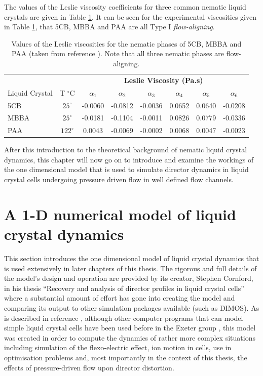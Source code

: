 The values of the Leslie viscosity coefficients for three common nematic liquid crystals are given in Table \ref{tab:visc}. It can be seen for the experimental viscosities given in Table \ref{tab:visc}, that 5CB, MBBA and PAA are all Type I \textit{flow-aligning}.
\\
\begin{table}[ht]
\centering  %
\begin{tabular}{l|c|cccccc} 
\hline\hline                       
&&\multicolumn{6}{c}{\textbf{Leslie Viscosity (Pa.s)}}\\
Liquid Crystal&T $^{\circ}$C&$\alpha_1$&$\alpha_2$&$\alpha_3$&$\alpha_4$&$\alpha_5$&$\alpha_6$\\
\hline                  
5CB &$25^{\circ}$& -0.0060& -0.0812&-0.0036&0.0652&0.0640&-0.0208\\
MBBA& $25^{\circ}$&-0.0181&-0.1104&-0.0011&0.0826&0.0779&-0.0336\\
PAA& $122^{\circ}$&0.0043&-0.0069&-0.0002&0.0068&0.0047&-0.0023\\
\hline
\end{tabular}
\caption[Values of the Leslie viscosities for the nematic phases of 5CB, MBBA and PAA]{Values of the Leslie viscosities for the nematic phases of 5CB, MBBA and PAA (taken from reference \cite{Stewart2004}). Note that all three nematic phases are flow-aligning.} 
\label{tab:visc}
\end{table}

After this introduction to the theoretical background of nematic liquid crystal dynamics, this chapter will now go on to introduce and examine the workings of the one dimensional model that is used to simulate director dynamics in liquid crystal cells undergoing pressure driven flow in well defined flow channels.

\newpage

\section{A 1-D numerical model of liquid crystal dynamics}
This section introduces the one dimensional model of liquid crystal dynamics that is used extensively in later chapters of this thesis. The rigorous and full details of the model's design and operation are provided by its creator, Stephen Cornford, in his thesis ``Recovery and analysis of director profiles in liquid crystal cells'' \cite{Cornford2008} where a substantial amount of effort has gone into creating the model and comparing its output to other simulation packages available (such as DIMOS). As is described in reference \cite{Cornford2008}, although other computer programs that can model simple liquid crystal cells have been used before in the Exeter group \cite{Birkett2008,Jewell2002}, this model was created in order to compute the dynamics of rather more complex situations including simulation of the flexo-electric effect, ion motion in cells, use in optimisation problems and, most importantly in the context of this thesis, the effects of pressure-driven flow upon director distortion.

